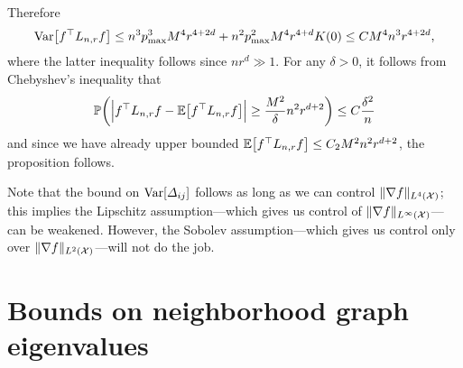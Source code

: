 Therefore
\begin{equation*}
\mathrm{Var}\bigl[f^{\top} L_{n,r} f\bigr] \leq n^3 p_{\max}^3 M^4 r^{4 + 2d} + n^2 p_{\max}^2 M^4 r^{4 + d} K(0) \leq C M^4 n^3r^{4 + 2d},
\end{equation*}
where the latter inequality follows since $nr^d \gg 1$. For any $\delta > 0$, it follows from Chebyshev's inequality that
\begin{equation*}
\mathbb{P}\biggl(\Bigl|f^{\top} L_{n,r} f - \mathbb{E}\bigl[f^{\top} L_{n,r} f\bigr]\Bigr| \geq \frac{M^2}{\delta}n^2 r^{d + 2}\biggr) \leq C\frac{\delta^2}{n}
\end{equation*}
and since we have already upper bounded $\mathbb{E}\bigl[f^{\top} L_{n,r} f\bigr] \leq C_2 M^2 n^2 r^{d + 2}$, the proposition follows. 

Note that the bound on $\mathrm{Var}[\varDelta_{i j}]$ follows as long as we can control $\|\nabla f\|_{L^4(\mathcal{X})}$; this implies the Lipschitz assumption---which gives us control of $\|\nabla f\|_{L^{\infty}(\mathcal{X})}$---can be weakened. However, the Sobolev assumption---which gives us control only over $\|\nabla f\|_{L^2(\mathcal{X})}$---will not do the job. 

\section{Bounds on neighborhood graph eigenvalues}
\label{sec:graph_eigenvalues}

